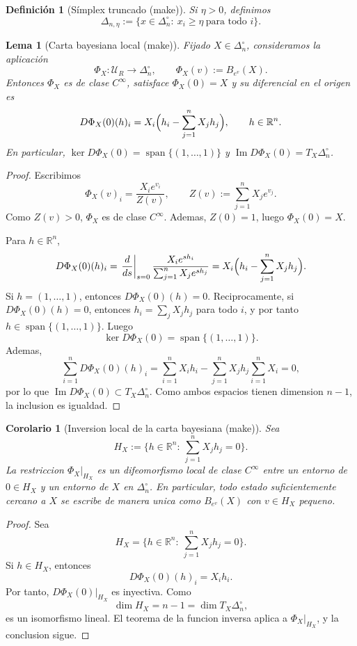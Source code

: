 ﻿\documentclass[12pt]{article}
\newcommand{\fuente}[1]{\textnormal{(#1)}}
\newtheorem{definicion}{Definición}[section]
\newtheorem{lema}{Lema}[section]
\newtheorem{corolario}{Corolario}[section]
\begin{document}
\begin{definicion}[Símplex truncado \fuente{make}]
Si \(\eta>0\), definimos
\[
\Delta_{n,\eta}:=\bigl\{x\in\Delta_n^\circ:\ x_i\ge \eta\ \text{para todo }i\bigr\}.
\]
\end{definicion}

\begin{lema}[Carta bayesiana local \fuente{make}]
Fijado \(X\in\Delta_n^\circ\), consideramos la aplicación
\[
\Phi_X:\mathcal U_R\to \Delta_n^\circ,
\qquad
\Phi_X(v):=B_{e^v}(X).
\]
Entonces \(\Phi_X\) es de clase \(C^\infty\), satisface \(\Phi_X(0)=X\) y su diferencial en el origen es
\[
D\Phi_X(0)(h)_i
=
X_i\Bigl(h_i-\sum_{j=1}^n X_j h_j\Bigr),
\qquad h\in\mathbb R^n.
\]
En particular, \(\ker D\Phi_X(0)=\operatorname{span}\{(1,\dots,1)\}\) y \(\operatorname{Im}D\Phi_X(0)=T_X\Delta_n^\circ\).
\end{lema}
\begin{proof}
Escribimos
\[
\Phi_X(v)_i=\frac{X_ie^{v_i}}{Z(v)},
\qquad
Z(v):=\sum_{j=1}^n X_je^{v_j}.
\]
Como \(Z(v)>0\), \(\Phi_X\) es de clase \(C^\infty\). Ademas, \(Z(0)=1\), luego \(\Phi_X(0)=X\).

Para \(h\in\mathbb R^n\),
\[
D\Phi_X(0)(h)_i
=
\left.\frac{d}{ds}\right|_{s=0}
\frac{X_ie^{sh_i}}{\sum_{j=1}^n X_je^{sh_j}}
=
X_i\Bigl(h_i-\sum_{j=1}^n X_jh_j\Bigr).
\]
Si \(h=(1,\dots,1)\), entonces \(D\Phi_X(0)(h)=0\). Reciprocamente, si \(D\Phi_X(0)(h)=0\), entonces \(h_i=\sum_j X_jh_j\) para todo \(i\), y por tanto \(h\in\operatorname{span}\{(1,\dots,1)\}\). Luego
\[
\ker D\Phi_X(0)=\operatorname{span}\{(1,\dots,1)\}.
\]
Ademas,
\[
\sum_{i=1}^n D\Phi_X(0)(h)_i
=
\sum_{i=1}^n X_ih_i-\sum_{j=1}^n X_jh_j\sum_{i=1}^n X_i
=
0,
\]
por lo que \(\operatorname{Im}D\Phi_X(0)\subset T_X\Delta_n^\circ\). Como ambos espacios tienen dimension \(n-1\), la inclusion es igualdad.
\end{proof}

\begin{corolario}[Inversion local de la carta bayesiana \fuente{make}]
Sea
\[
H_X:=\bigl\{h\in\mathbb R^n:\ \sum_{j=1}^n X_j h_j=0\bigr\}.
\]
La restriccion \(\Phi_X|_{H_X}\) es un difeomorfismo local de clase \(C^\infty\) entre un entorno de \(0\in H_X\) y un entorno de \(X\) en \(\Delta_n^\circ\). En particular, todo estado suficientemente cercano a \(X\) se escribe de manera unica como \(B_{e^v}(X)\) con \(v\in H_X\) pequeno.
\end{corolario}
\begin{proof}
Sea
\[
H_X=\bigl\{h\in\mathbb R^n:\ \sum_{j=1}^n X_jh_j=0\bigr\}.
\]
Si \(h\in H_X\), entonces
\[
D\Phi_X(0)(h)_i=X_ih_i.
\]
Por tanto, \(D\Phi_X(0)|_{H_X}\) es inyectiva. Como
\[
\dim H_X=n-1=\dim T_X\Delta_n^\circ,
\]
es un isomorfismo lineal. El teorema de la funcion inversa aplica a \(\Phi_X|_{H_X}\), y la conclusion sigue.
\end{proof}
\end{document}
